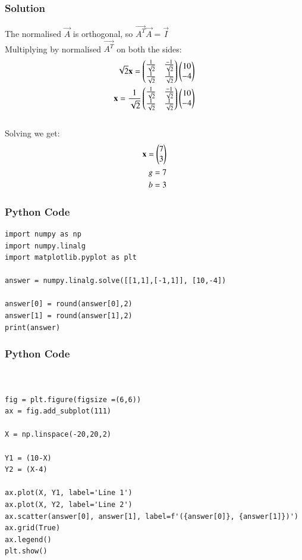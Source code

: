 \documentclass{beamer}
\begin{document}
\begin{frame}[fragile]
    \frametitle{Solution}
The normalised $\vec{A}$ is orthogonal, so  $\vec{A^T}\vec{A} = \vec{I}$\\
Multiplying by  normalised $\vec{A^T}$ on both the sides:
\begin{align}
\sqrt{2}\mathbf{x} = \begin{pmatrix}\frac{1}{\sqrt{2}} & \frac{-1}{\sqrt{2}} \\  \frac{1}{\sqrt{2}}& \frac{1}{\sqrt{2}}\end{pmatrix} \begin{pmatrix}10\\-4\end{pmatrix}\\
\mathbf{x} = \frac{1}{\sqrt{2}}\begin{pmatrix}\frac{1}{\sqrt{2}} & \frac{-1}{\sqrt{2}} \\  \frac{1}{\sqrt{2}}& \frac{1}{\sqrt{2}}\end{pmatrix} \begin{pmatrix}10\\-4\end{pmatrix}
\end{align}\\
Solving we get:\begin{align}
\mathbf{x} = \begin{pmatrix}7\\3\end{pmatrix} \\
g = 7\\
b=3
\end{align}
\end{frame}





\begin{frame}[fragile]
    \frametitle{Python Code}

    \begin{lstlisting}
import numpy as np
import numpy.linalg 
import matplotlib.pyplot as plt

answer = numpy.linalg.solve([[1,1],[-1,1]], [10,-4])

answer[0] = round(answer[0],2)
answer[1] = round(answer[1],2)
print(answer)
\end{lstlisting} 
\end{frame}

\begin{frame}[fragile]
    \frametitle{Python Code}

    \begin{lstlisting}


fig = plt.figure(figsize =(6,6))
ax = fig.add_subplot(111)

X = np.linspace(-20,20,2)

Y1 = (10-X)
Y2 = (X-4)

ax.plot(X, Y1, label='Line 1')
ax.plot(X, Y2, label='Line 2')
ax.scatter(answer[0], answer[1], label=f'({answer[0]}, {answer[1]})')
ax.grid(True)
ax.legend()
plt.show()

    \end{lstlisting}
\end{frame}
\end{document}
